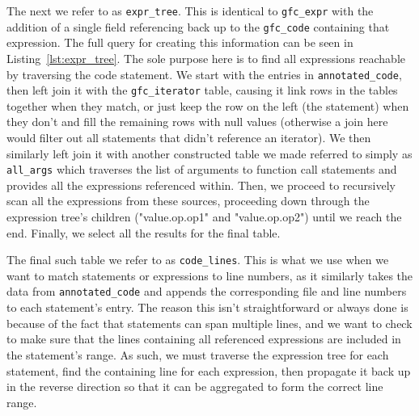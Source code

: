 The next we refer to as \texttt{expr\_tree}.
This is identical to \texttt{gfc\_expr} with the addition of a single field referencing back up to the \texttt{gfc\_code} containing that expression.
The full query for creating this information can be seen in Listing~\ref{lst:expr_tree}.
The sole purpose here is to find all expressions reachable by traversing the code statement.
We start with the entries in \texttt{annotated\_code}, then left join it with the \texttt{gfc\_iterator} table, causing it link rows in the tables together when they match, or just keep the row on the left (the statement) when they don't and fill the remaining rows with null values (otherwise a join here would filter out all statements that didn't reference an iterator).
We then similarly left join it with another constructed table we made referred to simply as \texttt{all\_args} which traverses the list of arguments to function call statements and provides all the expressions referenced within.
Then, we proceed to recursively scan all the expressions from these sources, proceeding down through the expression tree's children ("value.op.op1" and "value.op.op2") until we reach the end.
Finally, we select all the results for the final table.

The final such table we refer to as \texttt{code\_lines}.
This is what we use when we want to match statements or expressions to line numbers, as it similarly takes the data from \texttt{annotated\_code} and appends the corresponding file and line numbers to each statement's entry.
The reason this isn't straightforward or always done is because of the fact that statements can span multiple lines, and we want to check to make sure that the lines containing all referenced expressions are included in the statement's range.
As such, we must traverse the expression tree for each statement, find the containing line for each expression, then propagate it back up in the reverse direction so that it can be aggregated to form the correct line range.

